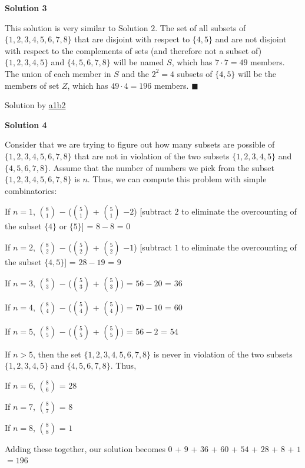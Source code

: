 \begin{enumerate}
 



\textbf{Solution 3}

This solution is very similar to Solution $2$. The set of all subsets of $\{1,2,3,4,5,6,7,8\}$ that are disjoint with respect to $\{4,5\}$ and are not disjoint with respect to the complements of sets (and therefore not a subset of) $\{1,2,3,4,5\}$ and $\{4,5,6,7,8\}$ will be named $S$, which has $7\cdot7=49$ members. The union of each member in $S$ and the $2^2=4$ subsets of $\{4,5\}$ will be the members of set $Z$, which has $49\cdot4=\boxed{196}$ members. $\blacksquare$

 Solution by \href{https://artofproblemsolving.com/wiki/index.php?title=User:A1b2}{a1b2}

 



\textbf{Solution 4}

Consider that we are trying to figure out how many subsets are possible of $\{1,2,3,4,5,6,7,8\}$ that are not in violation of the two subsets $\{1,2,3,4,5\}$ and $\{4,5,6,7,8\}$. Assume that the number of numbers we pick from the subset $\{1,2,3,4,5,6,7,8\}$ is $n$. Thus, we can compute this problem with simple combinatorics:

 If $n=1$, $\binom{8}{1}$ $-$ ($\binom{5}{1}$ + $\binom{5}{1}$ $-  2$) [subtract $2$ to eliminate the overcounting of the subset $\{4\}$ or $\{5\}$] = $8 - 8$ = $0$

 If $n=2$, $\binom{8}{2}$ $-$ ($\binom{5}{2}$ + $\binom{5}{2}$ $-  1$) [subtract $1$ to eliminate the overcounting of the subset $\{4,5\}$] = $28 - 19$ = $9$

 If $n=3$, $\binom{8}{3}$ $-$ ($\binom{5}{3}$ + $\binom{5}{3}$) = $56 - 20$ = $36$

 If $n=4$, $\binom{8}{4}$ $-$ ($\binom{5}{4}$ + $\binom{5}{4}$) = $70 - 10$ = $60$

 If $n=5$, $\binom{8}{5}$ $-$ ($\binom{5}{5}$ + $\binom{5}{5}$) = $56 - 2$ = $54$

 If $n>5$, then the set $\{1,2,3,4,5,6,7,8\}$ is never in violation of the two subsets $\{1,2,3,4,5\}$ and $\{4,5,6,7,8\}$. Thus,

 If $n=6$, $\binom{8}{6}$ = $28$

 If $n=7$, $\binom{8}{7}$ = $8$

 If $n=8$, $\binom{8}{8}$ = $1$

 Adding these together, our solution becomes $0$ + $9$ + $36$ + $60$ + $54$ + $28$ + $8$ + $1$ $=\boxed{196}$


\end{enumerate}
